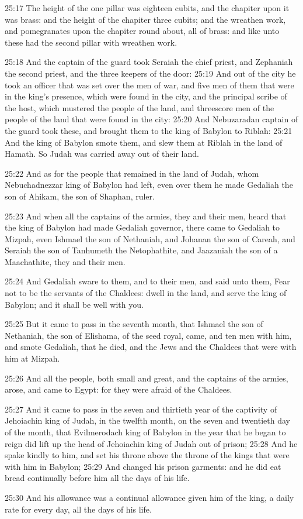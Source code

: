 25:17 The height of the one pillar was eighteen cubits, and the chapiter upon it was brass: and the height of the chapiter three cubits; and the wreathen work, and pomegranates upon the chapiter round about, all of brass: and like unto these had the second pillar with wreathen work.

25:18 And the captain of the guard took Seraiah the chief priest, and Zephaniah the second priest, and the three keepers of the door: 25:19 And out of the city he took an officer that was set over the men of war, and five men of them that were in the king's presence, which were found in the city, and the principal scribe of the host, which mustered the people of the land, and threescore men of the people of the land that were found in the city: 25:20 And Nebuzaradan captain of the guard took these, and brought them to the king of Babylon to Riblah: 25:21 And the king of Babylon smote them, and slew them at Riblah in the land of Hamath. So Judah was carried away out of their land.

25:22 And as for the people that remained in the land of Judah, whom Nebuchadnezzar king of Babylon had left, even over them he made Gedaliah the son of Ahikam, the son of Shaphan, ruler.

25:23 And when all the captains of the armies, they and their men, heard that the king of Babylon had made Gedaliah governor, there came to Gedaliah to Mizpah, even Ishmael the son of Nethaniah, and Johanan the son of Careah, and Seraiah the son of Tanhumeth the Netophathite, and Jaazaniah the son of a Maachathite, they and their men.

25:24 And Gedaliah sware to them, and to their men, and said unto them, Fear not to be the servants of the Chaldees: dwell in the land, and serve the king of Babylon; and it shall be well with you.

25:25 But it came to pass in the seventh month, that Ishmael the son of Nethaniah, the son of Elishama, of the seed royal, came, and ten men with him, and smote Gedaliah, that he died, and the Jews and the Chaldees that were with him at Mizpah.

25:26 And all the people, both small and great, and the captains of the armies, arose, and came to Egypt: for they were afraid of the Chaldees.

25:27 And it came to pass in the seven and thirtieth year of the captivity of Jehoiachin king of Judah, in the twelfth month, on the seven and twentieth day of the month, that Evilmerodach king of Babylon in the year that he began to reign did lift up the head of Jehoiachin king of Judah out of prison; 25:28 And he spake kindly to him, and set his throne above the throne of the kings that were with him in Babylon; 25:29 And changed his prison garments: and he did eat bread continually before him all the days of his life.

25:30 And his allowance was a continual allowance given him of the king, a daily rate for every day, all the days of his life.

